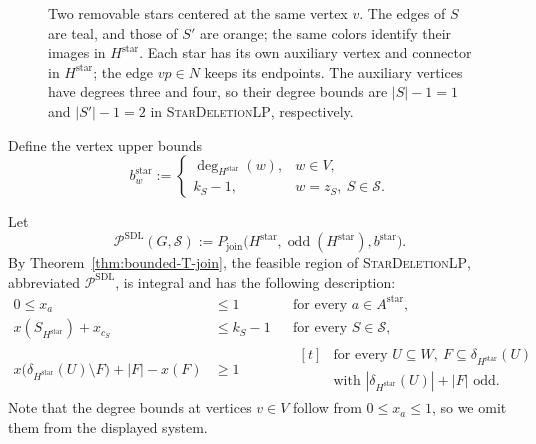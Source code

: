 \documentclass[11pt]{amsart}
\DeclareMathOperator{\odd}{odd}
\newcommand{\rep}[1]{\operatorname{rep}(#1)}
\newcommand{\1}{\mathbbm{1}}
\newcommand{\LPone}{\textsc{StarDeletionLP}}
\newcommand{\Pone}{\mathcal P^{\mathrm{SDL}}}
\begin{document}
\begin{figure}[htbp]
\caption{Two removable stars centered at the same vertex $v$.
The edges of $S$ are teal, and those of $S'$ are orange;
the same colors identify their images in $H^{\mathrm{star}}$.
Each star has its own auxiliary vertex and connector in
$H^{\mathrm{star}}$; the edge $vp\in N$ keeps its endpoints.
The auxiliary vertices have degrees three and four, so their degree bounds are $|S|-1=1$ and $|S'|-1=2$ in \LPone,
respectively.}
\label{fig:star-splitting}
\end{figure}


Define the vertex upper bounds
\begin{equation}
\label{eq:framework-1-demands}
    b^{\mathrm{star}}_w:=
    \begin{cases}
        \deg_{H^{\mathrm{star}}}(w), & w\in V,\\
        k_S-1, & w=z_S,\ S\in\mathcal{S}.
    \end{cases}
\end{equation}

Let
\[
    \Pone(G,\mathcal S):=P_{\mathrm{join}}\bigl(H^{\mathrm{star}},\odd(H^{\mathrm{star}}),b^{\mathrm{star}}\bigr).
\]
By Theorem~\ref{thm:bounded-T-join}, the feasible region of \LPone, abbreviated $\Pone$, is
integral and has the following description:
\begin{equation}
\label{eq:framework-1-polytope}
\begin{aligned}
 0\le x_a&\le1
 &&\text{for every }a\in A^{\mathrm{star}},\\[3pt]
 x(S_{H^{\mathrm{star}}})+x_{c_S}&\le k_S-1
 &&\text{for every }S\in\mathcal S,\\[3pt]
 x\bigl(\delta_{H^{\mathrm{star}}}(U)\setminus F\bigr)+|F|-x(F)&\ge1
 &&\begin{aligned}[t]
   &\text{for every }U\subseteq W,\ F\subseteq\delta_{H^{\mathrm{star}}}(U)\\
   &\text{with }|\delta_{H^{\mathrm{star}}}(U)|+|F|\text{ odd}.
 \end{aligned}
\end{aligned}
\end{equation}
Note that the degree bounds at vertices $v\in V$ follow from
$0\le x_a\le1$, 
so we omit them from the displayed system.\\
\end{document}
